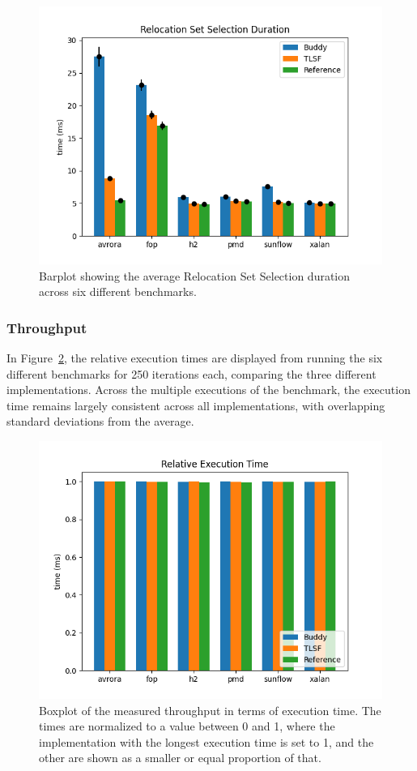 \begin{figure}[H]
\centering
\includegraphics[width=1\textwidth]{figures/set_selection2.png}
\caption{Barplot showing the average Relocation Set Selection duration across six different benchmarks.}
\label{fig:set-selection}
\end{figure}


\subsubsection{Throughput}
In Figure~\ref{fig:execution-time}, the relative execution times are displayed from running the six different benchmarks for 250 iterations each, comparing the three different implementations. Across the multiple executions of the benchmark, the execution time remains largely consistent across all implementations, with overlapping standard deviations from the average. 

\begin{figure}[H]
  \centering
\includegraphics[width=1\textwidth]{figures/execution_time2.png}
\caption{Boxplot of the measured throughput in terms of execution time. The times are normalized to a value between 0 and 1, where the implementation with the longest execution time is set to 1, and the other are shown as a smaller or equal proportion of that.}
\label{fig:execution-time}
\end{figure}

